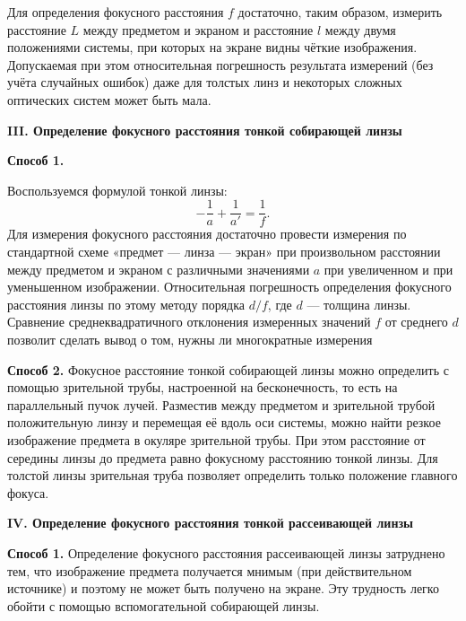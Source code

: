 \documentclass[a4paper,12pt]{report}
\begin{document}
Для определения фокусного расстояния $f$ достаточно, таким образом, измерить расстояние $L$ между предметом и экраном и расстояние $l$
между двумя положениями системы, при которых на экране видны чёткие изображения. Допускаемая при этом относительная погрешность
результата измерений (без учёта случайных ошибок) даже для толстых
линз и некоторых сложных оптических систем может быть мала.

\vspace{\baselineskip}
\noindent\textbf{III.  Определение фокусного расстояния тонкой собирающей линзы}
\vspace{\baselineskip}

\noindent\textbf{Способ 1.} 

Воспользуемся формулой тонкой линзы:
\begin{equation}
    -\frac{1}{a} + \frac{1}{a'} = \frac{1}{f}.
\end{equation}
Для измерения фокусного расстояния достаточно провести измерения по стандартной схеме «предмет — линза — экран» при произвольном расстоянии между предметом и экраном с различными значениями $a$ при увеличенном и при уменьшенном изображении. Относительная погрешность определения фокусного расстояния линзы по этому методу порядка $d/f$, где $d$ — толщина линзы. Сравнение среднеквадратичного отклонения измеренных значений $f$ от среднего $d$ позволит сделать
вывод о том, нужны ли многократные измерения

\noindent\textbf{Способ 2.} Фокусное расстояние тонкой собирающей линзы можно
определить с помощью зрительной трубы, настроенной на бесконечность, то есть на параллельный пучок лучей. Разместив между предметом и зрительной трубой положительную линзу и перемещая её вдоль
оси системы, можно найти резкое изображение предмета в окуляре зрительной трубы. При этом расстояние от середины линзы до предмета
равно фокусному расстоянию тонкой линзы. Для толстой линзы зрительная труба позволяет определить только положение главного фокуса.

\vspace{\baselineskip}
\noindent\textbf{IV.   Определение фокусного расстояния тонкой рассеивающей линзы}
\vspace{\baselineskip}

\noindent\textbf{Способ 1.} Определение фокусного расстояния рассеивающей линзы затруднено тем, что изображение предмета получается мнимым
(при действительном источнике) и поэтому не может быть получено
на экране. Эту трудность легко обойти с помощью вспомогательной
собирающей линзы.
\end{document}
